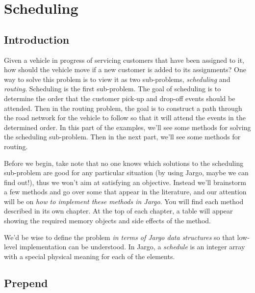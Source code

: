 \part{Scheduling}%
\label{part-scheduling}

\chapter{Introduction}
\label{sched-introduction}

\renewcommand{\thepage}{\arabic{page}}
\setcounter{page}{1}

Given a vehicle in progress of servicing customers that have been assigned to
it, how should the vehicle move if a new customer is added to its assignments?
One way to solve this problem is to view it as two sub-problems,
\emph{scheduling} and \emph{routing}. Scheduling is the first sub-problem. The
goal of scheduling is to determine the order that the customer pick-up and
drop-off events should be attended. Then in the routing problem, the goal is to
construct a path through the road network for the vehicle to follow so that it
will attend the events in the determined order. In this part of the examples,
we'll see some methods for solving the scheduling sub-problem. Then in the next
part, we'll see some methods for routing.

Before we begin, take note that no one knows which solutions to the scheduling
sub-problem are good for any particular situation (by using Jargo, maybe we can
find out!), thus we won't aim at satisfying an objective. Instead we'll
brainstorm a few methods and go over some that appear in the literature, and
our attention will be on \emph{how to implement these methods in Jargo}. You
will find each method described in its own chapter. At the top of each chapter,
a table will appear showing the required memory objects and side effects of the
method.

We'd be wise to define the problem \emph{in terms of Jargo data structures} so
that low-level implementation can be understood. In Jargo, a \emph{schedule} is
an integer array with a special physical meaning for each of the elements.

\chapter{Prepend}
\label{sched-prepend}

